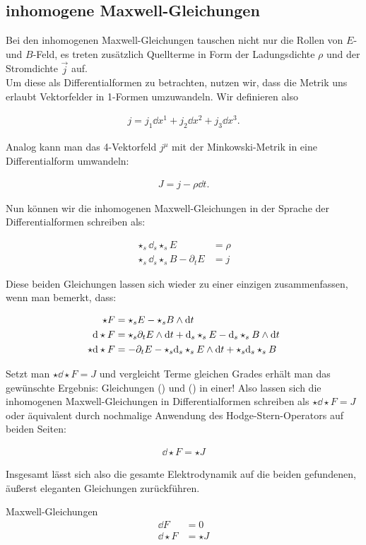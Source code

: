 \subsection{inhomogene Maxwell-Gleichungen}

Bei den inhomogenen Maxwell-Gleichungen tauschen nicht nur die Rollen von $E$- und $B$-Feld, es treten zusätzlich Quellterme in Form der Ladungsdichte $\rho$ und der Stromdichte $\vec{j}$ auf. \\
Um diese als Differentialformen zu betrachten, nutzen wir, dass die Metrik uns erlaubt Vektorfelder in 1-Formen umzuwandeln. Wir definieren also  

\begin{align}
j = j_1 \dd x^1 + j_2 \dd x^2 + j_3 \dd x^3. 
\end{align}

Analog kann man das 4-Vektorfeld $j^{\mu}$ mit der Minkowski-Metrik in eine Differentialform umwandeln:

\begin{align}
J = j - \rho \dd t. 
\end{align}

Nun können wir die inhomogenen Maxwell-Gleichungen in der Sprache der Differentialformen schreiben als:

\begin{align}
\star_s \dd_s \star_s E &= \rho \\
\star_s \dd_s \star_s B - \partial_t E &= j
\end{align}

Diese beiden Gleichungen lassen sich wieder zu einer einzigen zusammenfassen, wenn man bemerkt, dass:

\begin{align}
\star F &= \star_s E - \star_s B \wedge \dd t \\
\dd \star F &= \star_s \partial_t E  \wedge \dd t + \dd_s \star_s E - \dd_s \star_s B \wedge \dd t \\
\star \dd \star F &= - \partial_t E - \star_s \dd_s \star_s E \wedge \dd t + \star_s \dd_s \star_s B 		
\end{align}

Setzt man $\star \dd \star F = J$ und vergleicht Terme gleichen Grades erhält man das gewünschte Ergebnis: Gleichungen () und () in einer! Also lassen sich die inhomogenen Maxwell-Gleichungen in Differentialformen schreiben als $\star \dd \star F = J$ oder äquivalent durch nochmalige Anwendung des Hodge-Stern-Operators auf beiden Seiten:

\begin{align}
\dd \star F = \star J		
\end{align}


Insgesamt lässt sich also die gesamte Elektrodynamik auf die beiden gefundenen, äußerst eleganten Gleichungen zurückführen.

\begin{mybox}{Maxwell-Gleichungen}
\begin{align*}
\dd F &= 0 \\
\dd \star F &= \star J
\end{align*}
\end{mybox}
